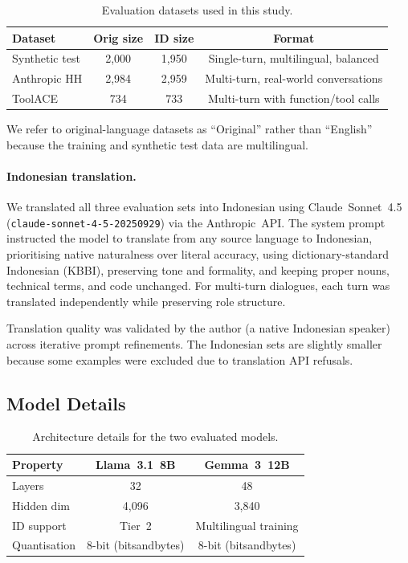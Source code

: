 \documentclass{article}
\newcommand{\llama}{Llama~3.1~8B\xspace}
\newcommand{\gemma}{Gemma~3~12B\xspace}
\begin{document}
\begin{table}[h]
\centering
\caption{Evaluation datasets used in this study.}
\label{tab:datasets}
\begin{tabular}{lccc}
\toprule
Dataset       & Orig size & ID size & Format \\
\midrule
Synthetic test  & 2,000 & 1,950 & Single-turn, multilingual, balanced \\
Anthropic HH  & 2,984 & 2,959 & Multi-turn, real-world conversations \\
ToolACE       & 734   & 733   & Multi-turn with function/tool calls \\
\bottomrule
\end{tabular}
\end{table}

We refer to original-language datasets as ``Original'' rather than ``English''
because the training and synthetic test data are multilingual.

\paragraph{Indonesian translation.}
We translated all three evaluation sets into Indonesian using
Claude~Sonnet~4.5 (\texttt{claude-sonnet-4-5-20250929}) via the Anthropic~API.
The system prompt instructed the model to translate from any source language to
Indonesian, prioritising native naturalness over literal accuracy, using
dictionary-standard Indonesian (KBBI), preserving tone and formality, and keeping
proper nouns, technical terms, and code unchanged.
For multi-turn dialogues, each turn was translated independently while preserving
role structure.

Translation quality was validated by the author (a native Indonesian speaker)
across iterative prompt refinements.
The Indonesian sets are slightly smaller because some examples were excluded
due to translation API refusals.

\subsection{Model Details}

\begin{table}[h]
\centering
\caption{Architecture details for the two evaluated models.}
\label{tab:models}
\begin{tabular}{lcc}
\toprule
Property       & \llama & \gemma \\
\midrule
Layers         & 32     & 48     \\
Hidden dim     & 4,096  & 3,840  \\
ID support     & Tier~2 & Multilingual training \\
Quantisation   & 8-bit (bitsandbytes) & 8-bit (bitsandbytes) \\
\bottomrule
\end{tabular}
\end{table}
\end{document}
